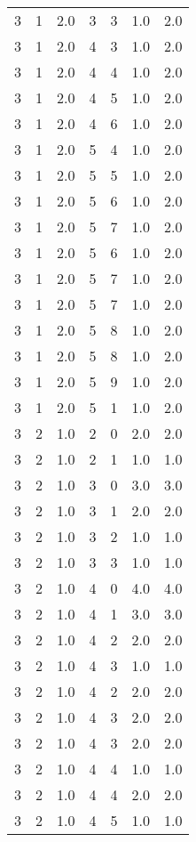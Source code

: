 \documentclass[a4paper,12pt]{article}
\begin{document}
\begin{center}
\begin{longtable}{ c c c | c c c | c }
        3 & 1 & 2.0 & 3 & 3 & 1.0 & 2.0 \\
        3 & 1 & 2.0 & 4 & 3 & 1.0 & 2.0 \\
        3 & 1 & 2.0 & 4 & 4 & 1.0 & 2.0 \\
        3 & 1 & 2.0 & 4 & 5 & 1.0 & 2.0 \\
        3 & 1 & 2.0 & 4 & 6 & 1.0 & 2.0 \\
        3 & 1 & 2.0 & 5 & 4 & 1.0 & 2.0 \\
        3 & 1 & 2.0 & 5 & 5 & 1.0 & 2.0 \\
        3 & 1 & 2.0 & 5 & 6 & 1.0 & 2.0 \\
        3 & 1 & 2.0 & 5 & 7 & 1.0 & 2.0 \\
        3 & 1 & 2.0 & 5 & 6 & 1.0 & 2.0 \\
        3 & 1 & 2.0 & 5 & 7 & 1.0 & 2.0 \\
        3 & 1 & 2.0 & 5 & 7 & 1.0 & 2.0 \\
        3 & 1 & 2.0 & 5 & 8 & 1.0 & 2.0 \\
        3 & 1 & 2.0 & 5 & 8 & 1.0 & 2.0 \\
        3 & 1 & 2.0 & 5 & 9 & 1.0 & 2.0 \\
        3 & 1 & 2.0 & 5 & 1 & 1.0 & 2.0 \\
        3 & 2 & 1.0 & 2 & 0 & 2.0 & 2.0 \\
        3 & 2 & 1.0 & 2 & 1 & 1.0 & 1.0 \\
        3 & 2 & 1.0 & 3 & 0 & 3.0 & 3.0 \\
        3 & 2 & 1.0 & 3 & 1 & 2.0 & 2.0 \\
        3 & 2 & 1.0 & 3 & 2 & 1.0 & 1.0 \\
        3 & 2 & 1.0 & 3 & 3 & 1.0 & 1.0 \\
        3 & 2 & 1.0 & 4 & 0 & 4.0 & 4.0 \\
        3 & 2 & 1.0 & 4 & 1 & 3.0 & 3.0 \\
        3 & 2 & 1.0 & 4 & 2 & 2.0 & 2.0 \\
        3 & 2 & 1.0 & 4 & 3 & 1.0 & 1.0 \\
        3 & 2 & 1.0 & 4 & 2 & 2.0 & 2.0 \\
        3 & 2 & 1.0 & 4 & 3 & 2.0 & 2.0 \\
        3 & 2 & 1.0 & 4 & 3 & 2.0 & 2.0 \\
        3 & 2 & 1.0 & 4 & 4 & 1.0 & 1.0 \\
        3 & 2 & 1.0 & 4 & 4 & 2.0 & 2.0 \\
        3 & 2 & 1.0 & 4 & 5 & 1.0 & 1.0 \\

\end{longtable}
\end{center}
\end{document}
